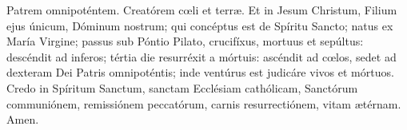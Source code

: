 Patrem omnipoténtem. Creatórem c{\oe}li et terr{\ae}. Et in Jesum Christum, Filium ejus únicum, Dóminum nostrum; 
qui concéptus est de Spíritu Sancto; natus ex María Virgine; passus sub Póntio Pilato, crucifíxus, mortuus et sepúltus:
descéndit ad inferos; tértia die resurréxit a mórtuis: ascéndit ad c{\oe}los, sedet ad dexteram Dei Patris omnipoténtis;
inde ventúrus est judicáre vivos et mórtuos. Credo in Spíritum Sanctum, sanctam Ecclésiam cathólicam, Sanctórum communiónem,
remissiónem peccatórum, carnis resurrectiónem, vitam {\ae}térnam. Amen.